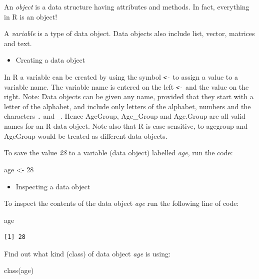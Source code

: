 \documentclass[
  letterpaper,
  DIV=11,
  numbers=noendperiod,
  oneside]{scrreprt}
\newenvironment{Shaded}{\begin{snugshade}}{\end{snugshade}}
\newcommand{\DecValTok}[1]{\textcolor[rgb]{0.68,0.00,0.00}{#1}}
\newcommand{\FunctionTok}[1]{\textcolor[rgb]{0.28,0.35,0.67}{#1}}
\newcommand{\NormalTok}[1]{\textcolor[rgb]{0.00,0.23,0.31}{#1}}
\newcommand{\OtherTok}[1]{\textcolor[rgb]{0.00,0.23,0.31}{#1}}
\providecommand{\tightlist}{%
  \setlength{\itemsep}{0pt}\setlength{\parskip}{0pt}}\usepackage{longtable,booktabs,array}
\begin{document}
An \emph{object} is a data structure having attributes and methods. In
fact, everything in R is an object!

A \emph{variable} is a type of data object. Data objects also include
list, vector, matrices and text.

\begin{itemize}
\tightlist
\item
  Creating a data object
\end{itemize}

In R a variable can be created by using the symbol \texttt{\textless{}-}
to assign a value to a variable name. The variable name is entered on
the left \texttt{\textless{}-} and the value on the right. Note: Data
objects can be given any name, provided that they start with a letter of
the alphabet, and include only letters of the alphabet, numbers and the
characters \texttt{.} and \texttt{\_}. Hence AgeGroup, Age\_Group and
Age.Group are all valid names for an R data object. Note also that R is
case-sensitive, to agegroup and AgeGroup would be treated as different
data objects.

To save the value \emph{28} to a variable (data object) labelled
\emph{age}, run the code:

\begin{Shaded}
\begin{Highlighting}[]
\NormalTok{age }\OtherTok{\textless{}{-}} \DecValTok{28}
\end{Highlighting}
\end{Shaded}

\begin{itemize}
\tightlist
\item
  Inspecting a data object
\end{itemize}

To inspect the contents of the data object \emph{age} run the following
line of code:

\begin{Shaded}
\begin{Highlighting}[]
\NormalTok{age}
\end{Highlighting}
\end{Shaded}

\begin{verbatim}
[1] 28
\end{verbatim}

Find out what kind (class) of data object \emph{age} is using:

\begin{Shaded}
\begin{Highlighting}[]
\FunctionTok{class}\NormalTok{(age) }
\end{Highlighting}
\end{Shaded}
\end{document}
